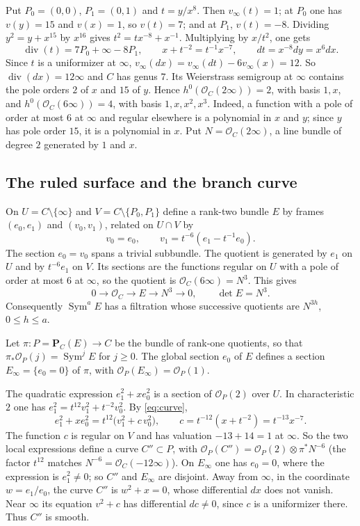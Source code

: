 \documentclass[11pt,a4paper]{article}
\theoremstyle{plain}
\theoremstyle{remark}
\newcommand{\OO}{\mathcal O}
\newcommand{\PP}{\mathbf P}
\newcommand{\Sym}{\operatorname{Sym}}
\begin{document}
Put $P_0=(0,0)$, $P_1=(0,1)$ and $t=y/x^8$. Then $v_\infty(t)=1$; at $P_0$ one has $v(y)=15$ and $v(x)=1$, so $v(t)=7$;
and at $P_1$, $v(t)=-8$. Dividing $y^2=y+x^{15}$ by $x^{16}$ gives $t^2=t x^{-8}+x^{-1}$. Multiplying by $x/t^2$, one
gets
\begin{equation}\label{eq:curve}
 \operatorname{div}(t)=7P_0+\infty-8P_1,\qquad x+t^{-2}=t^{-1}x^{-7},\qquad dt=x^{-8}dy=x^6dx .
\end{equation}
Since $t$ is a uniformizer at $\infty$, $v_\infty(dx)=v_\infty(dt)-6v_\infty(x)=12$. So $\operatorname{div}(dx)=12\infty$ and
$C$ has genus $7$. Its Weierstrass semigroup at $\infty$ contains the pole orders $2$ of $x$ and $15$ of $y$. Hence
$h^0(\OO_C(2\infty))=2$, with basis $1,x$, and $h^0(\OO_C(6\infty))=4$, with basis $1,x,x^2,x^3$. Indeed, a function with
a pole of order at most $6$ at $\infty$ and regular elsewhere is a polynomial in $x$ and $y$; since $y$ has pole order
$15$, it is a polynomial in $x$. Put $N=\OO_C(2\infty)$, a line bundle of degree $2$ generated by $1$ and $x$.

\subsection{The ruled surface and the branch curve}
On $U=C\setminus\{\infty\}$ and $V=C\setminus\{P_0,P_1\}$ define a rank-two bundle $E$ by frames $(e_0,e_1)$ and
$(v_0,v_1)$, related on $U\cap V$ by
\[
 v_0=e_0,\qquad v_1=t^{-6}(e_1-t^{-1}e_0).
\]
The section $e_0=v_0$ spans a trivial subbundle. The quotient is generated by $e_1$ on $U$ and by $t^{-6}e_1$ on $V$. Its
sections are the functions regular on $U$ with a pole of order at most $6$ at $\infty$, so the quotient is
$\OO_C(6\infty)=N^3$. This gives
\[
 0\to\OO_C\to E\to N^3\to0,\qquad\det E=N^3 .
\]
Consequently $\Sym^aE$ has a filtration whose successive quotients are $N^{3h}$, $0\le h\le a$.

Let $\pi:P=\PP_C(E)\to C$ be the bundle of rank-one quotients, so that $\pi_*\OO_P(j)=\Sym^jE$ for $j\ge0$. The global
section $e_0$ of $E$ defines a section $E_\infty=\{e_0=0\}$ of $\pi$, with $\OO_P(E_\infty)=\OO_P(1)$.

The quadratic expression $e_1^2+xe_0^2$ is a section of $\OO_P(2)$ over $U$. In characteristic $2$ one has
$e_1^2=t^{12}v_1^2+t^{-2}v_0^2$. By \eqref{eq:curve},
\[
 e_1^2+xe_0^2=t^{12}\bigl(v_1^2+c\,v_0^2\bigr),\qquad c=t^{-12}(x+t^{-2})=t^{-13}x^{-7}.
\]
The function $c$ is regular on $V$ and has valuation $-13+14=1$ at $\infty$. So the two local expressions define a curve
$C''\subset P$, with $\OO_P(C'')=\OO_P(2)\otimes\pi^*N^{-6}$ (the factor $t^{12}$ matches $N^{-6}=\OO_C(-12\infty)$).
On $E_\infty$ one has $e_0=0$, where the expression is $e_1^2\ne0$; so $C''$ and $E_\infty$ are disjoint. Away from
$\infty$, in the coordinate $w=e_1/e_0$, the curve $C''$ is $w^2+x=0$, whose differential $dx$ does not vanish. Near
$\infty$ its equation $v^2+c$ has differential $dc\ne0$, since $c$ is a uniformizer there. Thus $C''$ is smooth.
\end{document}
